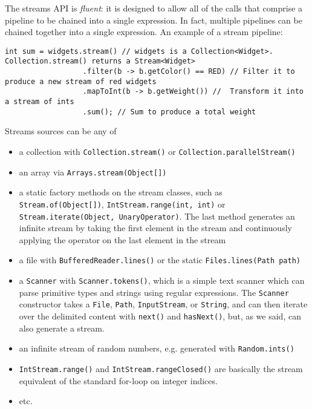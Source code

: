 \documentclass[8pt, table, xcdraw]{article}%
\begin{document}
The streams API is \emph{fluent}: it is designed to allow all of the calls that comprise a pipeline to be chained into a single expression. In fact, multiple pipelines can be chained together into a single expression. An example of a stream pipeline:

\begin{lstlisting}
int sum = widgets.stream() // widgets is a Collection<Widget>. Collection.stream() returns a Stream<Widget>
                  .filter(b -> b.getColor() == RED) // Filter it to produce a new stream of red widgets
                  .mapToInt(b -> b.getWeight()) //  Transform it into a stream of ints
                  .sum(); // Sum to produce a total weight
\end{lstlisting}

Streams sources can be any of

\begin{itemize}
    \item a collection with \lstinline{Collection.stream()} or \lstinline{Collection.parallelStream()}
    \item an array via \lstinline{Arrays.stream(Object[])}
    \item a static factory methods on the stream classes, such as \lstinline{Stream.of(Object[])}, \lstinline{IntStream.range(int, int)} or \lstinline{Stream.iterate(Object, UnaryOperator)}. The last method generates an infinite stream by taking the first element in the stream and continuously applying the operator on the last element in the stream
    \item a file with \lstinline{BufferedReader.lines()} or the static \lstinline{Files.lines(Path path)}
    \item a \lstinline{Scanner} with \lstinline{Scanner.tokens()}, which is a simple text scanner which can parse primitive types and strings using regular expressions. The \lstinline{Scanner} constructor takes a \lstinline{File}, \lstinline{Path}, \lstinline{InputStream}, or \lstinline{String}, and can then iterate over the delimited content with \lstinline{next()} and \lstinline{hasNext()}, but, as we said, can also generate a stream.
    \item an infinite stream of random numbers, e.g. generated with \lstinline{Random.ints()}
    \item \lstinline{IntStream.range()} and \lstinline{IntStream.rangeClosed()} are basically the stream equivalent of the standard for-loop on integer indices.
    \item etc.
\end{itemize}
\end{document}
